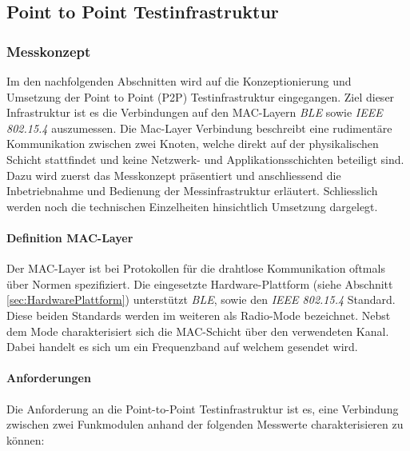 \vspace*{4cm}
\begin{center}
\part{Point to Point Testinfrastruktur}\label{PointtoPointTestinfrastruktur}
\end{center}
\vspace*{\fill}
\clearpage

\section{Messkonzept}\label{sec:KonzeptP2PMessung}

Im den nachfolgenden Abschnitten wird auf die Kon­zep­ti­o­nie­rung und Umsetzung der Point to Point (P2P) Testinfrastruktur eingegangen. Ziel dieser Infrastruktur ist es die Verbindungen auf den MAC-Layern \textit{BLE} sowie \textit{IEEE 802.15.4} auszumessen. Die Mac-Layer Verbindung beschreibt eine rudimentäre Kommunikation zwischen zwei Knoten, welche direkt auf der physikalischen Schicht stattfindet und keine Netzwerk- und Applikationsschichten beteiligt sind.
Dazu wird zuerst das Messkonzept präsentiert und anschliessend die Inbetriebnahme und Bedienung der Messinfrastruktur erläutert. Schliesslich werden noch die technischen Einzelheiten hinsichtlich Umsetzung dargelegt.

\subsection{Definition MAC-Layer}\label{sec:MAC-LayerP2P}

Der MAC-Layer ist bei Protokollen für die drahtlose Kommunikation oftmals über Normen spezifiziert. Die eingesetzte Hardware-Plattform (siehe Abschnitt \ref{sec:HardwarePlattform}) unterstützt \textit{BLE}, sowie den \textit{IEEE 802.15.4} Standard.
Diese beiden Standards werden im weiteren als Radio-Mode bezeichnet. Nebst dem Mode charakterisiert sich die MAC-Schicht über den verwendeten Kanal. Dabei handelt es sich um ein Frequenzband auf welchem gesendet wird. 

\subsection{Anforderungen}\label{subsec:AnforderungentP2P}

Die Anforderung an die Point-to-Point Testinfrastruktur ist es, eine Verbindung zwischen zwei Funkmodulen anhand der folgenden Messwerte charakterisieren zu können:


